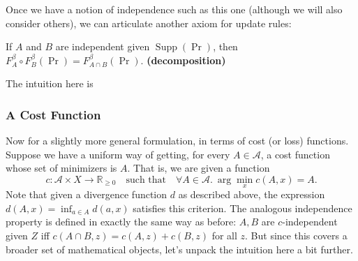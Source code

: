 \documentclass{article}
\DeclareMathOperator{\supp}{\mathrm{Supp}}
\begin{document}
Once we have a notion of independence such as this one (although we will also consider others), we can articulate another axiom for update rules:
\begin{URaxioms}
    \item
    If $A$ and $B$ are independent given $\supp(\Pr)$, then \\
    $F^{\beta}_A \circ F^{\beta}_B (\Pr) = F^{\beta}_{A \cap B}(\Pr)$.
        \hfill \textbf{(decomposition)}
\end{URaxioms}
The intuition here is

\bigskip


\subsubsection*{A Cost Function}
Now for a slightly more general formulation, in terms of cost (or loss) functions.
Suppose we have a uniform way of getting, for every $A \in \mathcal A$, a cost function whose set of minimizers is $A$. That is, we are given a function
\[ c : \mathcal A \times X \to \mathbb R_{\ge 0}
\quad\text{such that}\quad
\forall A \in \mathcal A.~\arg\min_{x} c(A, x) = A.
\]
Note that given a divergence function $d$ as described above, the expression $d(A, x) = \inf_{a \in A} d(a,x)$ satisfies this criterion. The analogous independence property is defined in exactly the same way as before:
$A, B$ are $c$-independent given $Z$ iff $c(A \cap B, z) = c(A, z) + c(B, z)$ for all $z$.
But since this covers a broader set of mathematical objects, let's unpack the intuition here a bit further.
\end{document}
